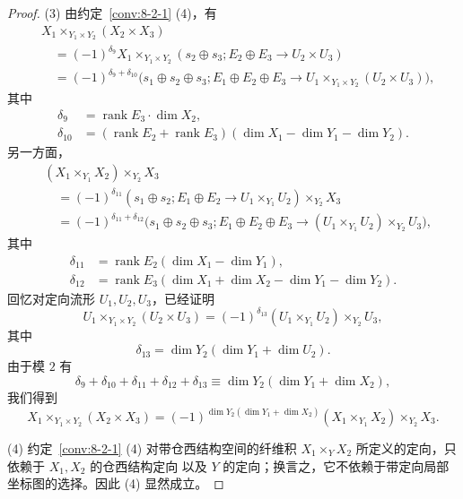 \begin{proof}
\textup{(3)} 由约定~\ref{conv:8-2-1} (4)，有
\[
\begin{aligned}
 &X_1\times_{Y_1\times Y_2}(X_2\times X_3)\\
 &\quad=(-1)^{\delta_9}X_1\times_{Y_1\times Y_2}
 (s_2\oplus s_3;E_2\oplus E_3\to U_2\times U_3)\\
 &\quad=(-1)^{\delta_9+\delta_{10}}
 \bigl(s_1\oplus s_2\oplus s_3;
 E_1\oplus E_2\oplus E_3
 \to U_1\times_{Y_1\times Y_2}(U_2\times U_3)\bigr),
\end{aligned}
\]
其中
\[
\begin{aligned}
 \delta_9&=\operatorname{rank}E_3\cdot\dim X_2,\\
 \delta_{10}&=(\operatorname{rank}E_2+\operatorname{rank}E_3)
 (\dim X_1-\dim Y_1-\dim Y_2).
\end{aligned}
\]
另一方面，
\[
\begin{aligned}
 &(X_1\times_{Y_1}X_2)\times_{Y_2}X_3\\
 &\quad=(-1)^{\delta_{11}}
 (s_1\oplus s_2;E_1\oplus E_2\to U_1\times_{Y_1}U_2)
 \times_{Y_2}X_3\\
 &\quad=(-1)^{\delta_{11}+\delta_{12}}
 \bigl(s_1\oplus s_2\oplus s_3;
 E_1\oplus E_2\oplus E_3
 \to(U_1\times_{Y_1}U_2)\times_{Y_2}U_3\bigr),
\end{aligned}
\]
其中
\[
\begin{aligned}
 \delta_{11}&=\operatorname{rank}E_2(\dim X_1-\dim Y_1),\\
 \delta_{12}&=\operatorname{rank}E_3
 (\dim X_1+\dim X_2-\dim Y_1-\dim Y_2).
\end{aligned}
\]
回忆对定向流形 $U_1,U_2,U_3$，已经证明
\[
 U_1\times_{Y_1\times Y_2}(U_2\times U_3)
 =(-1)^{\delta_{13}}(U_1\times_{Y_1}U_2)\times_{Y_2}U_3,
\]
其中
\[
 \delta_{13}=\dim Y_2(\dim Y_1+\dim U_2).
\]
由于模 $2$ 有
\[
 \delta_9+\delta_{10}+\delta_{11}+\delta_{12}+\delta_{13}
 \equiv\dim Y_2(\dim Y_1+\dim X_2),
\]
我们得到
\[
 X_1\times_{Y_1\times Y_2}(X_2\times X_3)
 =(-1)^{\dim Y_2(\dim Y_1+\dim X_2)}
 (X_1\times_{Y_1}X_2)\times_{Y_2}X_3.
\]

\textup{(4)} 约定~\ref{conv:8-2-1} (4) 对带仓西结构空间的纤维积
$X_1\times_YX_2$ 所定义的定向，只依赖于 $X_1,X_2$ 的仓西结构定向
以及 $Y$ 的定向；换言之，它不依赖于带定向局部坐标图的选择。因此
(4) 显然成立。
\end{proof}

